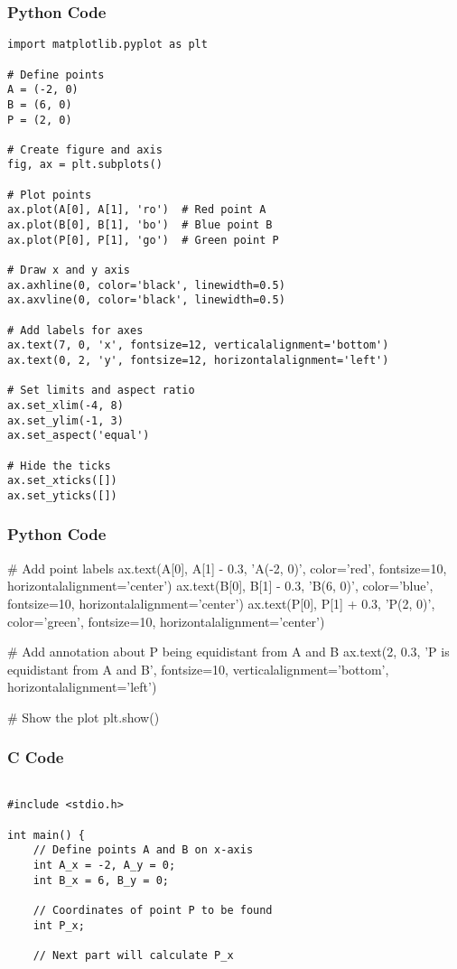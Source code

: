 \documentclass{beamer}
\begin{document}
\begin{frame}[fragile]
    \frametitle{Python Code}
    \begin{lstlisting}
import matplotlib.pyplot as plt

# Define points
A = (-2, 0)
B = (6, 0)
P = (2, 0)

# Create figure and axis
fig, ax = plt.subplots()

# Plot points
ax.plot(A[0], A[1], 'ro')  # Red point A
ax.plot(B[0], B[1], 'bo')  # Blue point B
ax.plot(P[0], P[1], 'go')  # Green point P

# Draw x and y axis
ax.axhline(0, color='black', linewidth=0.5)
ax.axvline(0, color='black', linewidth=0.5)

# Add labels for axes
ax.text(7, 0, 'x', fontsize=12, verticalalignment='bottom')
ax.text(0, 2, 'y', fontsize=12, horizontalalignment='left')

# Set limits and aspect ratio
ax.set_xlim(-4, 8)
ax.set_ylim(-1, 3)
ax.set_aspect('equal')

# Hide the ticks
ax.set_xticks([])
ax.set_yticks([])

\end{lstlisting}
\end{frame}

\begin{frame}[fragile]
    \frametitle{Python Code}
    
# Add point labels
ax.text(A[0], A[1] - 0.3, 'A(-2, 0)', color='red', fontsize=10, horizontalalignment='center')
ax.text(B[0], B[1] - 0.3, 'B(6, 0)', color='blue', fontsize=10, horizontalalignment='center')
ax.text(P[0], P[1] + 0.3, 'P(2, 0)', color='green', fontsize=10, horizontalalignment='center')

# Add annotation about P being equidistant from A and B
ax.text(2, 0.3, 'P is equidistant from A and B', fontsize=10, verticalalignment='bottom', horizontalalignment='left')

# Show the plot
plt.show()


\end{frame}

\begin{frame}[fragile]
\frametitle{C Code}
\begin{lstlisting}

#include <stdio.h>

int main() {
    // Define points A and B on x-axis
    int A_x = -2, A_y = 0;
    int B_x = 6, B_y = 0;
    
    // Coordinates of point P to be found
    int P_x;
    
    // Next part will calculate P_x


\end{lstlisting}

\end{frame}
\end{document}
